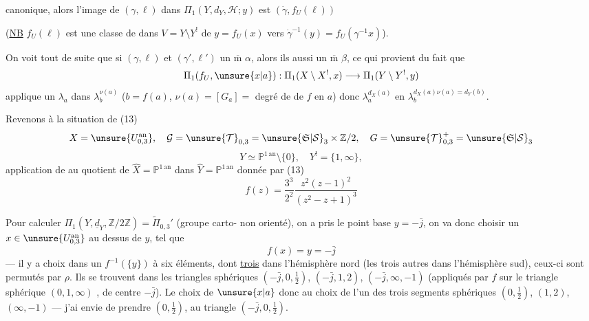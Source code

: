 

canonique, alors l'image \inserted{$\beta$} de
$(\gamma,\ell)$ 
dans $\Pi_1(Y,d_Y,\mathcal H;y)$ est $(\dot\gamma,f_U(\ell))$

(\uline{NB} $f_U(\ell)$ est une classe de  dans
$V=Y\setminus Y^!$ de $y=f_U(x)$ vers
$\dot\gamma^{-1}(y)=f_U(\gamma^{-1}x)$).

 On voit tout de suite que si
$(\gamma,\ell)$ et $(\gamma',\ell')$  un
$\overline{\mathrm m}$ $\alpha$, alors ils  aussi
un $\overline{\mathrm m}$ $\beta$, ce qui provient du fait que
\[
\Pi_1(f_U,\unsure{x|a}):\Pi_1(X\setminus X^!,x)
\longrightarrow\Pi_1(Y\setminus Y^!,y)
\]
applique un $\lambda_a$ dans  $\lambda_b^{\nu(a)}$
($b=f(a)$, $\nu(a)=[G_a]=$ degré de 
de $f$ en $a$) donc $\lambda_a^{d_X(a)}$ en
$\lambda_b^{d_X(a)\nu(a)=d_Y(b)}$.

Revenons à la situation de (13)
\[
X=\unsure{U_{0,3}^{\mathrm{an}}},\quad
\mathcal G=\unsure{\mathcal T}_{0,3}
=\unsure{\mathfrak S|\mathcal S}_3\times\mathbb Z/2,\quad
G=\unsure{\mathcal T}_{0,3}^{+}
=\unsure{\mathfrak S|\mathcal S}_3
\]
\[
Y\simeq\mathbb P^{1\,\mathrm{an}}\setminus\{0\},\quad
Y^!=\{1,\infty\},
\]
application de  au quotient de
$\widehat X=\mathbb P^{1\,\mathrm{an}}$ dans
$\widehat Y=\mathbb P^{1\,\mathrm{an}}$ donnée par (13)
\[
f(z)=\frac{3^3}{2^2}\frac{z^2(z-1)^2}{(z^2-z+1)^3}
\]


Pour calculer
$\Pi_1(Y,\underline{d}_Y,\mathbb Z/2\mathbb Z)
=\widetilde\Pi_{0,3}'$
(groupe carto-  non orienté),
on a pris le point base $y=-\bar j$, on va donc choisir
un $x\in\unsure{U_{0,3}^{\mathrm{an}}}$ au dessus de $y$, tel que
\[
f(x)=y=-\bar j
\]
--- il y a  
choix dans un  $f^{-1}(\{y\})$ à six
éléments, dont \uline{trois} dans l'hémisphère nord
(les trois autres dans l'hémisphère sud),
ceux-ci sont permutés  par $\rho$.
Ils se trouvent  dans les
triangles sphériques $(-\bar j,0,\frac12)$, $(-\bar j,1,2)$,
$(-\bar j,\infty,-1)$ (appliqués par $f$
 sur le triangle sphérique $(0,1,\infty)$
, 
de centre $-\bar j$).
Le choix de $\unsure{x|a}$  donc
au choix de l'un des trois
segments sphériques $(0,\frac12)$, $(1,2)$, $(\infty,-1)$
--- j'ai envie de prendre $(0,\frac12)$, 
au triangle $(-\bar j,0,\frac12)$.

